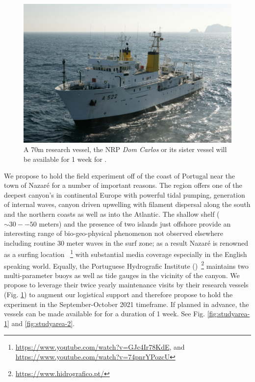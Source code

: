 \begin{figure}
  \vspace{-0.5cm}
  \centering
  \includegraphics[scale=2]{fig/dom-carlos.jpg}
  \caption{A 70m research vessel, the NRP \emph{Dom Carlos} or its
    sister vessel will be available for 1 week for \proje.}
  \vspace{-0.3cm}
 \label{fig:vessel}
\end{figure}


We propose to hold the field experiment off of the coast of Portugal
near the town of Nazar\'e for a number of important reasons. The
region offers one of the deepest canyon's in continental Europe with
powerful tidal pumping, generation of internal waves, canyon driven
upwelling with filament dispersal along the south and the northern
coasts as well as into the Atlantic. The shallow shelf ($\sim 30--50$
meters) and the presence of two islands just offshore provide an
interesting range of bio-geo-physical phenomenon not observed
elsewhere including routine 30 meter waves in the surf zone; as a
result Nazar\'e is renowned as a surfing location
~\footnote{\url{https://www.youtube.com/watch?v=GJc4Ir78KdE}, and
  \url{https://www.youtube.com/watch?v=74pnrYPozcU}} with substantial
media coverage especially in the English speaking world.  Equally, the
Portuguese Hydrografic Institute
(\inste)~\footnote{\url{https://www.hidrografico.pt/}} maintains two
multi-parameter buoys as well as tide gauges in the vicinity of the
canyon. We propose to leverage their twice yearly maintenance visits
by their research vessels (Fig. \ref{fig:vessel}) to augment our
logistical support and therefore propose to hold the experiment in the
September-October 2021 timeframe. If planned in advance, the vessels
can be made available for \proj for a duration of 1 week. See
Fig. \ref{fig:studyarea-1} and \ref{fig:studyarea-2}.

